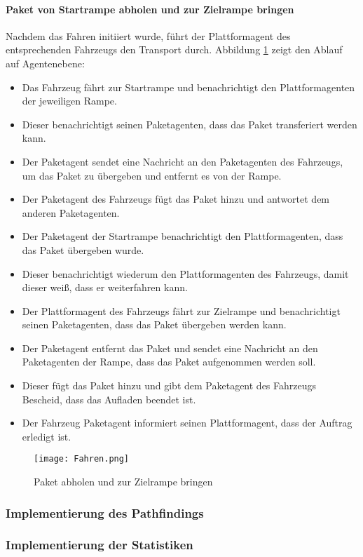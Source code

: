 \paragraph{Paket von Startrampe abholen und zur Zielrampe bringen}
Nachdem das Fahren initiiert wurde, führt der Plattformagent des entsprechenden Fahrzeugs den Transport durch. Abbildung \ref{Fahren} zeigt den Ablauf auf Agentenebene:
\begin{itemize}
\item Das Fahrzeug fährt zur Startrampe und benachrichtigt den Plattformagenten der jeweiligen Rampe.
\item Dieser benachrichtigt seinen Paketagenten, dass das Paket transferiert werden kann. 
\item Der Paketagent sendet eine Nachricht an den Paketagenten des Fahrzeugs, um das Paket zu übergeben und entfernt es von der Rampe.
\item Der Paketagent des Fahrzeugs fügt das Paket hinzu und antwortet dem anderen Paketagenten.
\item Der Paketagent der Startrampe  benachrichtigt den Plattformagenten, dass das Paket übergeben wurde.
\item Dieser benachrichtigt wiederum den Plattformagenten des Fahrzeugs, damit dieser weiß, dass er weiterfahren kann.
\item Der Plattformagent des Fahrzeugs fährt zur Zielrampe und benachrichtigt seinen Paketagenten, dass das Paket übergeben werden kann.
\item Der Paketagent entfernt das Paket und sendet eine Nachricht an den Paketagenten der Rampe, dass das Paket aufgenommen werden soll.
\item Dieser fügt das Paket hinzu und gibt dem Paketagent des Fahrzeugs Bescheid, dass das Aufladen beendet ist.
\item Der Fahrzeug Paketagent informiert seinen Plattformagent, dass der Auftrag erledigt ist.
\end{itemize}
\begin{figure}[h!]
	\centering
		\texttt{[image: Fahren.png]}        
		\caption{Paket abholen und zur Zielrampe bringen}
	\label{Fahren}
\end{figure}
\subsubsection{Implementierung des Pathfindings}
\subsubsection{Implementierung der Statistiken}
